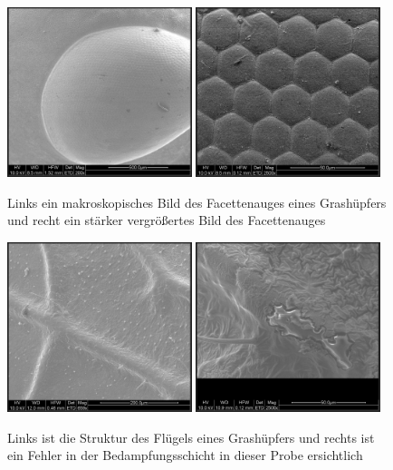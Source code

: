 \documentclass[12pt,english,ngerman]{scrartcl}
\begin{document}
\begin{figure}[H]
	\centering
	\includegraphics[width=0.48\textwidth]{./figures/auge.png}
	\includegraphics[width=0.48\textwidth]{./figures/auge2.png}
	\caption{Links ein makroskopisches Bild des Facettenauges eines Grashüpfers und recht ein stärker vergrößertes Bild des Facettenauges
	}\label{fig:auge}
\end{figure}

\begin{figure}[H]
	\centering
	\includegraphics[width=0.48\textwidth]{./figures/flugel.png}
	\includegraphics[width=0.48\textwidth]{./figures/damage.png}
	\caption{Links ist die Struktur des Flügels eines Grashüpfers und rechts ist ein Fehler in der Bedampfungsschicht in dieser Probe ersichtlich
	}\label{fig:flugel}
\end{figure}
\newpage
\end{document}
